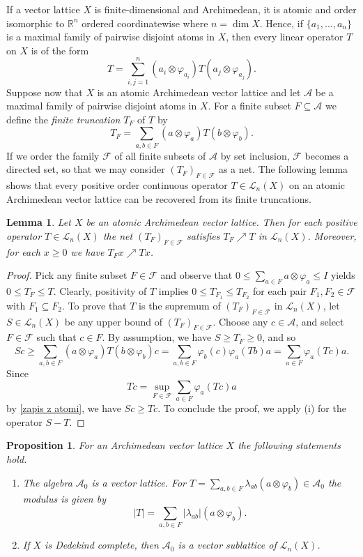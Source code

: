 \documentclass[12pt,reqno]{amsart}
\theoremstyle{plain}
\newtheorem{proposition}[theorem]{Proposition}
\newtheorem{lemma}[theorem]{Lemma}
\theoremstyle{definition}
\begin{document}
If a vector lattice $X$ is finite-dimensional and Archimedean, it is atomic and order isomorphic to $\mathbb R^n$ ordered coordinatewise where $n=\dim X$. Hence, if $\{a_1,\ldots,a_n\}$ is a maximal family of pairwise disjoint atoms in $X$, then every linear operator $T$ on $X$ is of the form 
$$T=\sum_{i,j=1}^n(a_i\otimes \varphi_{a_i})T(a_j\otimes \varphi_{a_j}).$$
Suppose now that $X$ is an atomic Archimedean vector lattice and let $\mathcal A$ be a maximal family of pairwise disjoint atoms in $X$. For a finite subset $F\subseteq \mathcal A$ we define the \emph{finite truncation} $T_F$ of $T$ by 
$$T_F= \sum_{a,b\in F}(a\otimes \varphi_{a})T(b\otimes \varphi_{b}).$$
If we order the family $\mathcal F$ of all finite subsets of $\mathcal A$ by set inclusion, $\mathcal F$ becomes a directed set, so that we may consider $(T_F)_{F\in \mathcal F}$ as a net.  
The following lemma shows that every positive order continuous operator $T\in \mathscr L_n(X)$ on an atomic Archimedean vector lattice can be recovered from its finite truncations. 

\begin{lemma}\label{urejenostna gostost}
Let $X$ be an atomic Archimedean vector lattice. Then for each positive operator $T\in \mathscr L_n(X)$ the net
$(T_F)_{F\in \mathcal F}$ satisfies $T_F\nearrow T$ in $\mathscr L_n(X)$.
Moreover, for each $x\geq 0$ we have 
$T_Fx\nearrow Tx$.
\end{lemma}

\begin{proof}
Pick any finite subset $F\in \mathcal F$ and observe that $0\leq \sum_{a\in F}a\otimes \varphi_a\leq I$ yields
$0\leq T_F\leq T$. 
Clearly, positivity of $T$ implies $0\leq T_{F_1}\leq T_{F_2}$ for each pair $F_1, F_2\in \mathcal F$ with $F_1\subseteq F_2$. To prove that $T$ is the supremum of $(T_F)_{F\in \mathcal F}$ in $\mathscr L_n(X)$, let $S\in \mathscr L_n(X)$ be any upper bound of $(T_F)_{F\in \mathcal F}$. Choose any $c\in \mathcal A$, and select $F\in \mathcal F$ such that $c\in F$. By assumption, we have
$S\geq T_F\geq 0$, and so
$$Sc\geq \sum_{a,b\in F}(a\otimes \varphi_a)T(b\otimes \varphi_b)c=\sum_{a,b\in F}\varphi_b(c)\varphi_a(Tb)a=\sum_{a\in F}\varphi_a(Tc)a.$$
Since
$$Tc=\sup_{F\in \mathcal F}\sum_{a\in F}\varphi_a(Tc)a$$
by \eqref{zapis z atomi}, 
we have $Sc\geq Tc$. To conclude the proof, we apply (i) for the operator $S-T$. 
\end{proof}


\begin{proposition}\label{A_0 mreza}
    For an Archimedean vector lattice $X$ the following statements hold.
    \begin{enumerate}
        \item The algebra $\mathscr A_0$ is a vector lattice. For $T=\sum_{a,b\in F}\lambda_{ab}(a\otimes \varphi_b)\in \mathscr A_0$ the modulus is given by 
        $$|T|=\sum_{a,b\in F}|\lambda_{ab}|(a\otimes \varphi_b).$$
        \item If $X$ is Dedekind complete, then $\mathscr A_0$ is a vector sublattice of $\mathscr L_n(X)$.
    \end{enumerate}
\end{proposition}
\end{document}
